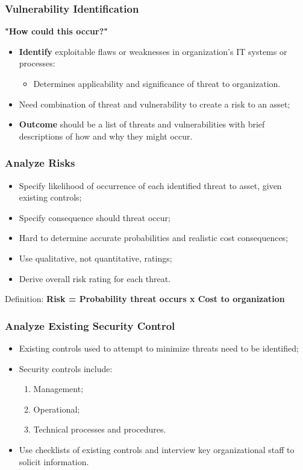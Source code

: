 \documentclass[xcolor ={table,usenames,dvipsnames}]{beamer}
\theoremstyle{definition}
\begin{document}
	\begin{frame}
		\frametitle{Vulnerability Identification}
		 \textbf{"How could this occur?"}
		\begin{itemize}
			\item \textbf{Identify} exploitable flaws or weaknesses in organization’s IT systems or processes:
			\begin{itemize}
				\item Determines applicability and significance of threat to organization.
			\end{itemize}
			\item Need combination of threat and vulnerability to create a risk to an asset;
			\item \textbf{Outcome} should be a list of threats and vulnerabilities with brief descriptions of how and why they might occur.
		\end{itemize}
	\end{frame}
	
	\begin{frame}
		\frametitle{Analyze Risks}
		\begin{itemize}
			\item Specify likelihood of occurrence of each identified threat to asset, given existing controls;
			\item Specify consequence should threat occur;
			\item Hard to determine accurate probabilities and realistic cost consequences;
			\item Use qualitative, not quantitative, ratings; 
			\item Derive overall risk rating for each threat.
		\end{itemize}
		\begin{alertblock}{Definition:}
			\textbf{Risk = Probability threat occurs x Cost to organization}
		\end{alertblock}
	\end{frame}

	\begin{frame}
		\frametitle{Analyze Existing Security Control } 
		\begin{itemize}
			\item Existing controls used to attempt to minimize threats need to be identified;
			\item Security controls include:
			\begin{enumerate}
				\item Management;
				\item Operational;
				\item Technical processes and procedures.
			\end{enumerate}
			\item Use checklists of existing controls and interview key organizational staff to solicit information.
		\end{itemize}
	\end{frame}
\end{document}
